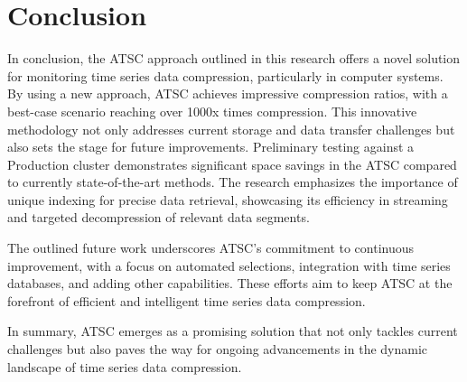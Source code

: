 \documentclass[conference]{IEEEtran}
\begin{document}
\section{Conclusion}

In conclusion, the ATSC approach outlined in this research offers a novel solution for monitoring time series data compression, particularly in computer systems. By using a new approach, ATSC achieves impressive compression ratios, with a best-case scenario reaching over 1000x times compression. This innovative methodology not only addresses current storage and data transfer challenges but also sets the stage for future improvements.
\vspace{5pt}
Preliminary testing against a Production cluster demonstrates significant space savings in the ATSC compared to currently state-of-the-art methods. The research emphasizes the importance of unique indexing for precise data retrieval, showcasing its efficiency in streaming and targeted decompression of relevant data segments.

The outlined future work underscores ATSC's commitment to continuous improvement, with a focus on automated selections, integration with time series databases, and adding other capabilities. These efforts aim to keep ATSC at the forefront of efficient and intelligent time series data compression.

In summary, ATSC emerges as a promising solution that not only tackles current challenges but also paves the way for ongoing advancements in the dynamic landscape of time series data compression.

\end{document}
